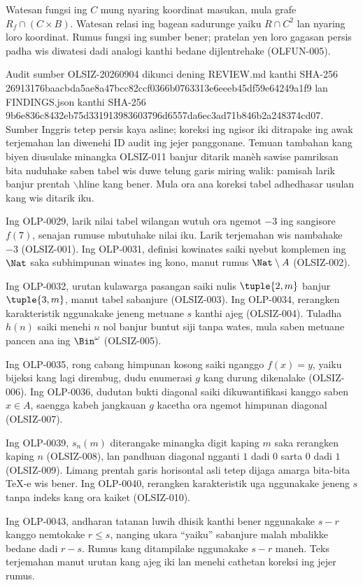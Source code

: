 Watesan fungsi ing $C$ mung nyaring koordinat masukan, mula grafe
$R_f\cap(C\times B)$. Watesan relasi ing bagean sadurunge yaiku
$R\cap C^2$ lan nyaring loro koordinat. Rumus fungsi ing sumber bener;
pratelan yen loro gagasan persis padha wis diwatesi dadi analogi
kanthi bedane dijlentrehake (OLFUN-005).

Audit sumber OLSIZ-20260904 dikunci dening REVIEW.md kanthi SHA-256
26913176baacbda5ae8a47bcc82ccf0366b0763313e6eeeb45df59e64249a1f9
lan FINDINGS.json kanthi SHA-256
9b6e836c8432eb75d331913983603796d6557da6ec3ad71b846b2a248374cd07.
Sumber Inggris tetep persis kaya asline; koreksi ing ngisor iki ditrapake
ing awak terjemahan lan diwenehi ID audit ing jejer panggonane.
Temuan tambahan kang biyen diusulake minangka OLSIZ-011 banjur ditarik
manèh sawise pamriksan bita nuduhake saben tabel wis duwe telung garis
miring walik: pamisah larik banjur prentah $\backslash$hline kang bener.
Mula ora ana koreksi tabel adhedhasar usulan kang wis ditarik iku.

Ing OLP-0029, larik nilai tabel wilangan wutuh ora ngemot $-3$
ing sangisore $f(7)$, senajan rumuse mbutuhake nilai iku. Larik terjemahan
wis nambahake $-3$ (OLSIZ-001). Ing OLP-0031, definisi kowinates saiki
nyebut komplemen ing $\Nat$ saka subhimpunan winates ing kono,
manut rumus $\Nat\setminus A$ (OLSIZ-002).

Ing OLP-0032, urutan kulawarga pasangan saiki nulis
$\tuple{2,m}$ banjur $\tuple{3,m}$, manut tabel sabanjure (OLSIZ-003).
Ing OLP-0034, rerangken karakteristik nggunakake jeneng metuane $s$
kanthi ajeg (OLSIZ-004). Tuladha $h(n)$ saiki menehi $n$ nol banjur
buntut siji tanpa wates, mula saben metuane pancen ana ing $\Bin^\omega$
(OLSIZ-005).

Ing OLP-0035, rong cabang himpunan kosong saiki nganggo $f(x)=y$,
yaiku bijeksi kang lagi dirembug, dudu enumerasi $g$ kang durung
dikenalake (OLSIZ-006). Ing OLP-0036, dudutan bukti diagonal saiki
dikuwantifikasi kanggo saben $x\in A$, saengga kabeh jangkauan $g$
kacetha ora ngemot himpunan diagonal (OLSIZ-007).

Ing OLP-0039, $s_n(m)$ diterangake minangka digit kaping $m$ saka
rerangken kaping $n$ (OLSIZ-008), lan pandhuan diagonal ngganti $1$
dadi $0$ sarta $0$ dadi $1$ (OLSIZ-009). Limang prentah garis horisontal
asli tetep dijaga amarga bita-bita TeX-e wis bener.
Ing OLP-0040, rerangken karakteristik uga nggunakake jeneng $s$
tanpa indeks kang ora kaiket (OLSIZ-010).

Ing OLP-0043, andharan tatanan luwih dhisik kanthi bener nggunakake
$s-r$ kanggo nemtokake $r\leq s$, nanging ukara ``yaiku'' sabanjure
malah mbalikke bedane dadi $r-s$. Rumus kang ditampilake nggunakake
$s-r$ maneh. Teks terjemahan manut urutan kang ajeg iki lan menehi
cathetan koreksi ing jejer rumus.

